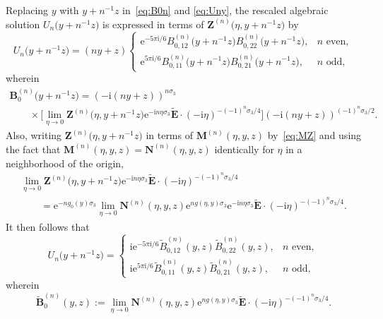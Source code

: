 \documentclass[11pt]{article}
\numberwithin{equation}{section}
\numberwithin{equation}{section}
\begin{document}
Replacing $y$ with $y+n^{-1}z$ in~\eqref{eq:B0n} and \eqref{eq:Uny}, the rescaled algebraic solution $U_n\bigl(y+n^{-1}z\bigr)$ is expressed in terms of $\mathbf{Z}^{(n)}\bigl(\eta,y+n^{-1}z\bigr)$ by
\begin{equation*}
U_n\bigl(y+n^{-1}z\bigr) = (ny+z)\begin{cases}\mathrm{e}^{-5\pi\mathrm{i}/6}B^{(n)}_{0,12}\bigl(y+n^{-1}z\bigr)B^{(n)}_{0,22}\bigl(y+n^{-1}z\bigr),&\text{$n$ even},\\\mathrm{e}^{5\pi\mathrm{i}/6}B^{(n)}_{0,11}\bigl(y+n^{-1}z\bigr)B^{(n)}_{0,21}\bigl(y+n^{-1}z\bigr),&\text{$n$ odd},\end{cases}
\end{equation*}
wherein
\begin{gather*}
 \mathbf{B}_0^{(n)}\bigl(y+n^{-1}z\bigr)=(-\mathrm{i} (ny+z))^{n\sigma_3} \\
\qquad{}\times\Big[\lim_{\eta\to 0}\mathbf{Z}^{(n)}\bigl(\eta,y+n^{-1}z\bigr)\mathrm{e}^{-\mathrm{i} n\eta\sigma_3}\widetilde{\mathbf{E}}\cdot(-\mathrm{i} \eta)^{-(-1)^n\sigma_3/4}\Big](-\mathrm{i} (ny+z))^{(-1)^n\sigma_3/2}.
\end{gather*}
Also, writing $\mathbf{Z}^{(n)}\bigl(\eta,y+n^{-1}z\bigr)$ in terms of $\mathbf{M}^{(n)}(\eta,y,z)$ by~\eqref{eq:MZ} and using the fact that $\mathbf{M}^{(n)}(\eta,y,z)=\mathbf{N}^{(n)}(\eta,y,z)$ identically for $\eta$ in a neighborhood of the origin, %
\begin{gather*}
\lim_{\eta\to 0}\mathbf{Z}^{(n)}\bigl(\eta,y+n^{-1}z\bigr)\mathrm{e}^{-\mathrm{i} n\eta\sigma_3}\widetilde{\mathbf{E}}\cdot (-\mathrm{i}\eta)^{-(-1)^n\sigma_3/4} \\
\qquad = \mathrm{e}^{-ng_0(y)\sigma_3}\lim_{\eta\to 0}\mathbf{N}^{(n)}(\eta,y,z)\mathrm{e}^{ng(\eta,y)\sigma_3}\mathrm{e}^{-\mathrm{i} n\eta\sigma_3}\widetilde{\mathbf{E}}\cdot (-\mathrm{i}\eta)^{-(-1)^n\sigma_3/4}.
\end{gather*}
It then follows that
\begin{equation*}
U_n\bigl(y+n^{-1}z\bigr) = \begin{cases}\mathrm{i}\mathrm{e}^{-5\pi\mathrm{i}/6}\widetilde{B}^{(n)}_{0,12}(y,z)\widetilde{B}^{(n)}_{0,22}(y,z),&\text{$n$ even},\\\mathrm{i}\mathrm{e}^{5\pi\mathrm{i}/6}\widetilde{B}^{(n)}_{0,11}(y,z)\widetilde{B}^{(n)}_{0,21}(y,z),&\text{$n$ odd},\end{cases}
\end{equation*}
wherein
\begin{equation*}
\widetilde{\mathbf{B}}^{(n)}_0(y,z):=\lim_{\eta\to 0}\mathbf{N}^{(n)}(\eta,y,z)\mathrm{e}^{ng(\eta,y)\sigma_3}\widetilde{\mathbf{E}}\cdot (-\mathrm{i}\eta)^{-(-1)^n\sigma_3/4}.
\end{equation*}
\end{document}
